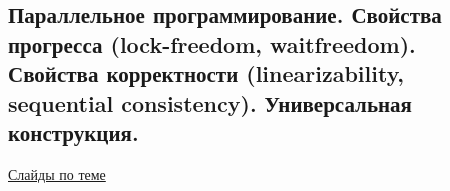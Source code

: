 \subsection{Параллельное программирование. Свойства прогресса (lock-freedom, waitfreedom). Свойства корректности (linearizability, sequential consistency). Универсальная конструкция.}

\href{https://www.babichev.org/tpmtp/Lecture08.pdf}{Слайды по теме}